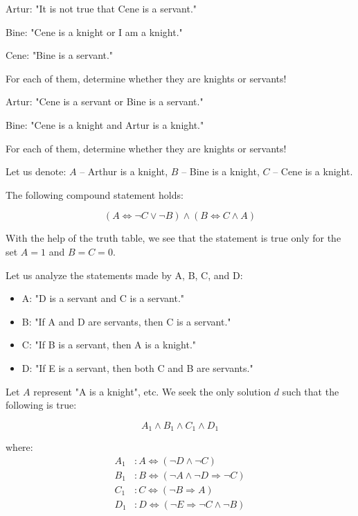 \documentclass[11pt,paper=b5,footinclude,headinclude]{scrbook} %
\theoremstyle{remark}
\theoremstyle{definition} %
\theoremstyle{theorem} %
\newtheorem{ex}{Exercise\hypertarget{sol:\theex}}[chapter]
\begin{document}
\begin{ex} 
 Artur: "It is not true that Cene is a servant."
 
Bine: "Cene is a knight or I am a knight."

Cene: "Bine is a servant."

For each of them, determine whether they are knights or servants!


\end{ex} \begin{ex} Artur: "Cene is a servant or Bine is a servant."

Bine: "Cene is a knight and Artur is a knight."

For each of them, determine whether they are knights or servants!

\begin{sol}
    
Let us denote: $A$ – Arthur is a knight, $B$ – Bine is a knight, $C$ – Cene is a knight.

The following compound statement holds:

\[
(A \iff \neg C \lor \neg B) \land (B \iff C \land A)
\]

With the help of the truth table, we see that the statement is true only for the set $A = 1$ and $B = C = 0$.
\end{sol}

    \end{ex} \begin{ex} Let us analyze the statements made by A, B, C, and D:

\begin{itemize}
    \item A: "D is a servant and C is a servant."
    \item B: "If A and D are servants, then C is a servant."
    \item C: "If B is a servant, then A is a knight."
    \item D: "If E is a servant, then both C and B are servants."
\end{itemize}

\begin{sol}
Let \( A \) represent "A is a knight", etc. We seek the only solution \( d \) such that the following is true:

\[
A_1 \land B_1 \land C_1 \land D_1
\]

where:
\begin{align*}
A_1 &: A \iff (\neg D \land \neg C)\\
B_1 &: B \iff (\neg A \land \neg D \Rightarrow \neg C)\\
C_1 &: C \iff (\neg B \Rightarrow A)\\
D_1 &: D \iff (\neg E \Rightarrow \neg C \land \neg B)\\
\end{align*}



\end{sol}
\end{ex}
\end{document}
